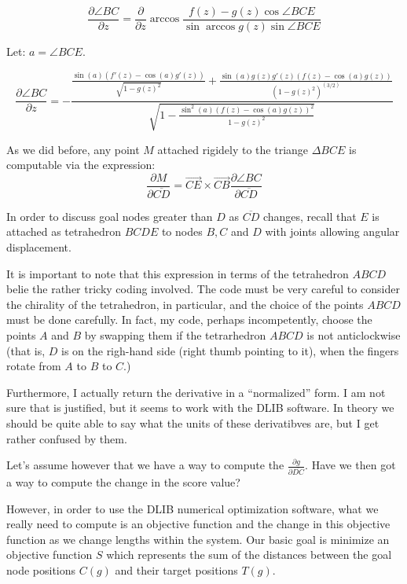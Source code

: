 \documentclass[11pt]{article}
\begin{document}
\begin{equation}
  \frac{\partial \angle BC}{\partial z} =
  \frac{\partial }{\partial z} \arccos{\frac{f(z) - g(z)\cos{\angle BCE}}{\sin{\arccos{g(z)}}\sin{\angle BCE}}}
\end{equation}

Let: $a = \angle BCE$.

\begin{equation}
  \frac{\partial \angle BC}{\partial z} =
  -\frac{\frac{\sin{(a)} (f'(z) - \cos{(a)} g'(z))}{\sqrt{1 - g(z)^2}} + \frac{\sin{(a)} g(z) g'(z) (f(z) - \cos{(a)} g(z))}{(1 - g(z)^2)^(3/2)}}
{\sqrt{1 - \frac{\sin^2{(a)} (f(z) - \cos{(a)} g(z))^2}{1 - g(z)^2}}}
\end{equation}


As we did before, any point $M$ attached rigidely to the triange $\Delta BCE$ is  computable via the expression:
\begin{equation}
  \frac{\partial M}{\partial \overline{CD}} = \overrightarrow{CE} \times \overrightarrow{CB}
  \frac{\partial \angle BC}{\partial \overline{CD}}
  \end{equation}

In order to discuss goal nodes greater than $D$ as $\overline{CD}$ changes, recall that $E$ is attached as tetrahedron $BCDE$ to nodes $B, C$ and $D$
with joints allowing angular displacement. 


 It is important to note that this expression in terms of the tetrahedron $ABCD$ belie the rather tricky coding
 involved. The code must be very careful to consider the chirality of the tetrahedron, in particular, and
 the choice of the points $ABCD$ must be done carefully. In fact, my code, perhaps incompetently, choose the points $A$ and $B$
 by swapping them if the tetrarhedron $ABCD$ is not anticlockwise (that is, $D$ is on the righ-hand side (right thumb pointing to it),
 when the fingers rotate from $A$ to $B$ to $C$.)

 Furthermore, I actually return the derivative in a ``normalized'' form. I am not sure that is justified, but it seems to work with the
 DLIB software. In theory we should be quite able to say what the units of these derivatibves are, but I get rather confused by them.
 
Let's assume however that we have a way to compute the $\frac{\partial g}{\partial \overline{DC}}$. Have we then got a way to compute
the change in the score value?

However, in order to use the DLIB numerical optimization software, what we really need to compute is
an objective function and the change in this objective function as we change lengths within the system.
Our basic goal is minimize an objective function $S$ which represents the sum of the distances between the
goal node positions $C(g)$  and their target positions $T(g)$.
\end{document}

